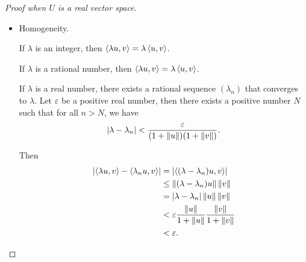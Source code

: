 \begin{proof}[Proof when $U$ is a real vector space]
\begin{itemize}
              \begin{align*}
                  \innerprod{a + b, c} & = \frac{\norm{a + b + c}^{2} - \norm{a + b}^{2} - \norm{c}^{2}}{2}                                          \\
                                       & = \frac{\norm{a + c}^{2} + \norm{b + c}^{2} - \norm{a}^{2} - \norm{b}^{2} - 2\norm{c}^{2}}{2}               \\
                                       & = \frac{\norm{a + c}^{2} - \norm{a}^{2} - \norm{c}^{2} + \norm{b + c}^{2} - \norm{b}^{2} - \norm{c}^{2}}{2} \\
                                       & = \innerprod{a, c} + \innerprod{b, c}.
              \end{align*}

              Hence the 1st slot is additive.
        \item Homogeneity.

              If $\lambda$ is an integer, then $\left\langle{\lambda u, v}\right\rangle = \lambda\left\langle{u, v}\right\rangle$.

              If $\lambda$ is a rational number, then $\left\langle{\lambda u, v}\right\rangle = \lambda\left\langle{u, v}\right\rangle$.

              If $\lambda$ is a real number, there exists a rational sequence ${(\lambda_{n})}$ that converges to $\lambda$. Let $\varepsilon$ be a positive real number, then there exists a positive number $N$ such that for all $n > N$, we have
              \[
                  \left\vert{\lambda - \lambda_{n}}\right\vert < \frac{\varepsilon}{(1 + \left\Vert{u}\right\Vert)(1 + \left\Vert{v}\right\Vert)}.
              \]

              Then
              \begin{align*}
                  \left\vert{\left\langle{\lambda u, v}\right\rangle - \left\langle{\lambda_{n} u, v}\right\rangle}\right\vert & = \left\vert{\left\langle{(\lambda - \lambda_{n})u, v}\right\rangle}\right\vert                          \\
                                                                                & \leq \left\Vert{(\lambda - \lambda_{n})u}\right\Vert\left\Vert{v}\right\Vert                             \\
                                                                                & = \left\vert{\lambda - \lambda_{n}}\right\vert\left\Vert{u}\right\Vert\left\Vert{v}\right\Vert                            \\
                                                                                & < \varepsilon \frac{\left\Vert{u}\right\Vert}{1 + \left\Vert{u}\right\Vert}\frac{\left\Vert{v}\right\Vert}{1 + \left\Vert{v}\right\Vert} \\
                                                                                & < \varepsilon.
              \end{align*}


\end{itemize}
\end{proof}
